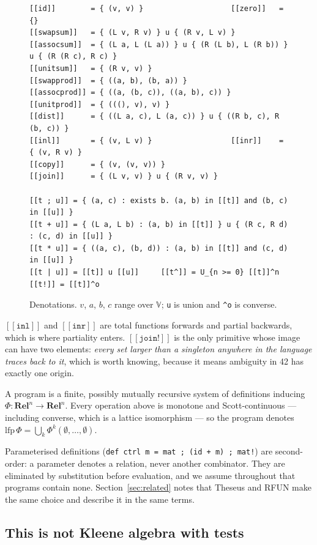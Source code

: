 \documentclass[runningheads,envcountsame]{llncs}
\newcommand{\den}[1]{\ensuremath{[\![#1]\!]}}
\newcommand{\Rel}{\textbf{Rel}}
\begin{document}
\begin{figure}[t]
\begin{lstlisting}
[[id]]        = { (v, v) }                    [[zero]]   = {}
[[swapsum]]   = { (L v, R v) } u { (R v, L v) }
[[assocsum]]  = { (L a, L (L a)) } u { (R (L b), L (R b)) } u { (R (R c), R c) }
[[unitsum]]   = { (R v, v) }
[[swapprod]]  = { ((a, b), (b, a)) }
[[assocprod]] = { ((a, (b, c)), ((a, b), c)) }
[[unitprod]]  = { (((), v), v) }
[[dist]]      = { ((L a, c), L (a, c)) } u { ((R b, c), R (b, c)) }
[[inl]]       = { (v, L v) }                  [[inr]]    = { (v, R v) }
[[copy]]      = { (v, (v, v)) }
[[join]]      = { (L v, v) } u { (R v, v) }

[[t ; u]] = { (a, c) : exists b. (a, b) in [[t]] and (b, c) in [[u]] }
[[t + u]] = { (L a, L b) : (a, b) in [[t]] } u { (R c, R d) : (c, d) in [[u]] }
[[t * u]] = { ((a, c), (b, d)) : (a, b) in [[t]] and (c, d) in [[u]] }
[[t | u]] = [[t]] u [[u]]     [[t^]] = U_{n >= 0} [[t]]^n     [[t!]] = [[t]]^o
\end{lstlisting}
\caption{Denotations. $v$, $a$, $b$, $c$ range over $\mathbb{V}$; \texttt{u} is
union and \texttt{\^{}o} is converse.}
\label{fig:sem}
\end{figure}

$\den{\texttt{inl}}$ and $\den{\texttt{inr}}$ are total functions forwards and
partial backwards, which is where partiality enters. $\den{\texttt{join!}}$ is the
only primitive whose image can have two elements: \emph{every set larger than a
singleton anywhere in the language traces back to it}, which is worth knowing,
because it means ambiguity in 42 has exactly one origin.

A program is a finite, possibly mutually recursive system of definitions inducing
$\Phi : \Rel^n \to \Rel^n$. Every operation above is monotone and Scott-continuous
--- including converse, which is a lattice isomorphism --- so the program denotes
$\mathrm{lfp}\,\Phi = \bigcup_k \Phi^k(\emptyset,\dots,\emptyset)$.

Parameterised definitions (\texttt{def ctrl m = mat ; (id + m) ; mat!}) are
second-order: a parameter denotes a relation, never another combinator. They are
eliminated by substitution before evaluation, and we assume throughout that
programs contain none. Section~\ref{sec:related} notes that Theseus and RFUN make
the same choice and describe it in the same terms.

\subsection{This is not Kleene algebra with tests}
\end{document}
